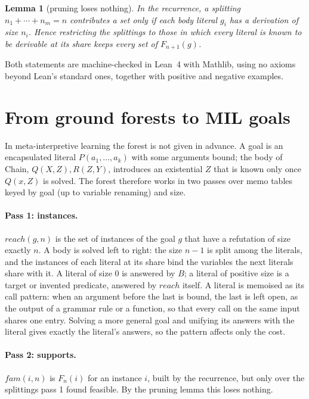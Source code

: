 \documentclass[11pt]{article}
\newtheorem{lemma}[theorem]{Lemma}
\newcommand{\F}{F}
\begin{document}
\begin{lemma}[pruning loses nothing]
In the recurrence, a splitting $n_1 + \cdots + n_m = n$ contributes a set only if
each body literal $g_i$ has a derivation of size $n_i$. Hence restricting the
splittings to those in which every literal is known to be derivable at its share
keeps every set of $\F_{n+1}(g)$.
\end{lemma}

Both statements are machine-checked in Lean~4 with Mathlib, using no axioms beyond
Lean's standard ones, together with positive and negative examples.

\section{From ground forests to MIL goals}

In meta-interpretive learning the forest is not given in advance. A goal is an
encapsulated literal $P(a_1, \ldots, a_k)$ with some arguments bound; the body of
Chain, $Q(X, Z), R(Z, Y)$, introduces an existential $Z$ that is known only once
$Q(x, Z)$ is solved. The forest therefore works in two passes over memo tables
keyed by goal (up to variable renaming) and size.

\paragraph{Pass 1: instances.} $\mathit{reach}(g, n)$ is the set of instances of the
goal $g$ that have a refutation of size exactly $n$. A body is solved left to right:
the size $n - 1$ is split among the literals, and the instances of each literal at
its share bind the variables the next literals share with it. A literal of size $0$
is answered by $B$; a literal of positive size is a target or invented predicate,
answered by $\mathit{reach}$ itself. A literal is memoised as its call pattern: when
an argument before the last is bound, the last is left open, as the output of a
grammar rule or a function, so that every call on the same input shares one entry.
Solving a more general goal and unifying its answers with the literal gives exactly
the literal's answers, so the pattern affects only the cost.

\paragraph{Pass 2: supports.} $\mathit{fam}(i, n)$ is $\F_n(i)$ for an instance $i$,
built by the recurrence, but only over the splittings pass 1 found feasible. By the
pruning lemma this loses nothing.
\end{document}
